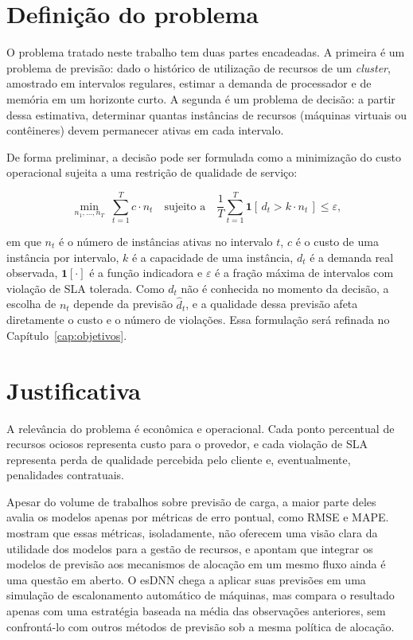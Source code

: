 \section{Definição do problema}
\label{sec:definicao-problema}

O problema tratado neste trabalho tem duas partes encadeadas. A primeira é um problema de previsão: dado o histórico de utilização de recursos de um \textit{cluster}, amostrado em intervalos regulares, estimar a demanda de processador e de memória em um horizonte curto. A segunda é um problema de decisão: a partir dessa estimativa, determinar quantas instâncias de recursos (máquinas virtuais ou contêineres) devem permanecer ativas em cada intervalo.

De forma preliminar, a decisão pode ser formulada como a minimização do custo operacional sujeita a uma restrição de qualidade de serviço:

\begin{equation}
\label{eq:problema}
\min_{n_1, \dots, n_T} \; \sum_{t=1}^{T} c \cdot n_t
\quad \text{sujeito a} \quad
\frac{1}{T} \sum_{t=1}^{T} \mathbf{1}\left[\, d_t > k \cdot n_t \,\right] \leq \varepsilon,
\end{equation}

\noindent em que $n_t$ é o número de instâncias ativas no intervalo $t$, $c$ é o custo de uma instância por intervalo, $k$ é a capacidade de uma instância, $d_t$ é a demanda real observada, $\mathbf{1}[\cdot]$ é a função indicadora e $\varepsilon$ é a fração máxima de intervalos com violação de SLA tolerada. Como $d_t$ não é conhecida no momento da decisão, a escolha de $n_t$ depende da previsão $\hat{d}_t$, e a qualidade dessa previsão afeta diretamente o custo e o número de violações. Essa formulação será refinada no Capítulo~\ref{cap:objetivos}.

\section{Justificativa}
\label{sec:justificativa}

A relevância do problema é econômica e operacional. Cada ponto percentual de recursos ociosos representa custo para o provedor, e cada violação de SLA representa perda de qualidade percebida pelo cliente e, eventualmente, penalidades contratuais.

Apesar do volume de trabalhos sobre previsão de carga, a maior parte deles avalia os modelos apenas por métricas de erro pontual, como RMSE e MAPE.  mostram que essas métricas, isoladamente, não oferecem uma visão clara da utilidade dos modelos para a gestão de recursos, e apontam que integrar os modelos de previsão aos mecanismos de alocação em um mesmo fluxo ainda é uma questão em aberto. O esDNN \cite{xu2022esdnn} chega a aplicar suas previsões em uma simulação de escalonamento automático de máquinas, mas compara o resultado apenas com uma estratégia baseada na média das observações anteriores, sem confrontá-lo com outros métodos de previsão sob a mesma política de alocação.

